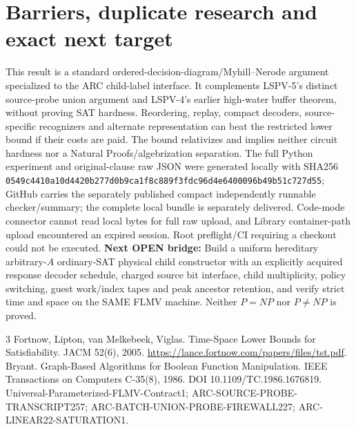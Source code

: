 \documentclass[10pt]{article}
\begin{document}
\section{Barriers, duplicate research and exact next target}
This result is a standard ordered-decision-diagram/Myhill--Nerode argument specialized to the ARC child-label interface. It complements LSPV-5's distinct source-probe union argument and LSPV-4's earlier high-water buffer theorem, without proving SAT hardness. Reordering, replay, compact decoders, source-specific recognizers and alternate representation can beat the restricted lower bound if their costs are paid. The bound relativizes and implies neither circuit hardness nor a Natural Proofs/algebrization separation. The full Python experiment and original-clause raw JSON were generated locally with SHA256 \texttt{0549c4410a10d4420b277d0b9ca1f8c889f3fdc96d4e6400096b49b51c727d55}; GitHub carries the separately published compact independently runnable checker/summary; the complete local bundle is separately delivered. Code-mode connector cannot read local bytes for full raw upload, and Library container-path upload encountered an expired session. Root preflight/CI requiring a checkout could not be executed.
\noindent\textbf{Next OPEN bridge:} Build a uniform hereditary arbitrary-$A$ ordinary-SAT physical child constructor with an explicitly acquired response decoder schedule, charged source bit interface, child multiplicity, policy switching, guest work/index tapes and peak ancestor retention, and verify strict time and space on the SAME FLMV machine. Neither $P=NP$ nor $P\ne NP$ is proved.
\begin{thebibliography}{3}
 Fortnow, Lipton, van Melkebeek, Viglas. Time-Space Lower Bounds for Satisfiability. JACM 52(6), 2005. \url{https://lance.fortnow.com/papers/files/tst.pdf}.
 Bryant. Graph-Based Algorithms for Boolean Function Manipulation. IEEE Transactions on Computers C-35(8), 1986. DOI 10.1109/TC.1986.1676819.
 Universal-Parameterized-FLMV-Contract1; ARC-SOURCE-PROBE-TRANSCRIPT257; ARC-BATCH-UNION-PROBE-FIREWALL227; ARC-LINEAR22-SATURATION1.
\end{thebibliography}
\end{document}
